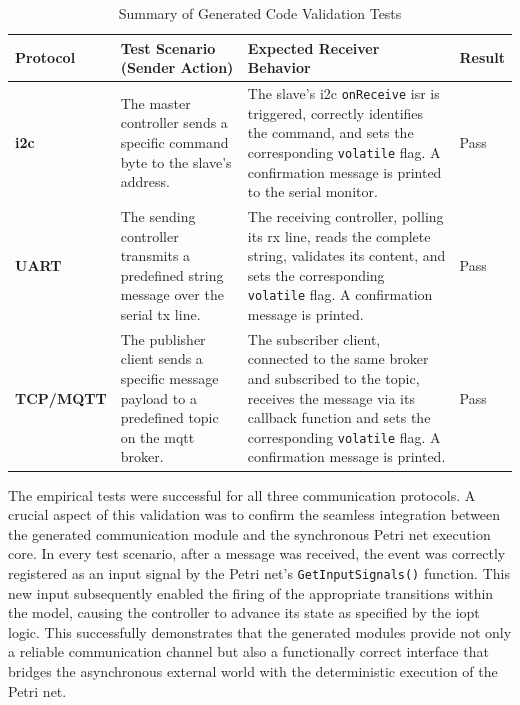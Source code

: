 \begin{table}[h!]
\centering
\caption{Summary of Generated Code Validation Tests}
\label{tab:code_validation_results}
\begin{tabular}{|l|p{4cm}|p{4cm}|p{2cm}|}
\hline
\textbf{Protocol} & \textbf{Test Scenario (Sender Action)} & \textbf{Expected Receiver Behavior} & \textbf{Result} \\ \hline
\textbf{\gls{i2c}} & The master controller sends a specific command byte to the slave's address. & The slave's \gls{i2c} \texttt{onReceive} \gls{isr} is triggered, correctly identifies the command, and sets the corresponding \texttt{volatile} flag. A confirmation message is printed to the serial monitor. & Pass \\ \hline
\textbf{UART} & The sending controller transmits a predefined string message over the serial \gls{tx} line. & The receiving controller, polling its \gls{rx} line, reads the complete string, validates its content, and sets the corresponding \texttt{volatile} flag. A confirmation message is printed. & Pass \\ \hline
\textbf{TCP/MQTT} & The publisher client sends a specific message payload to a predefined topic on the \gls{mqtt} broker. & The subscriber client, connected to the same broker and subscribed to the topic, receives the message via its callback function and sets the corresponding \texttt{volatile} flag. A confirmation message is printed. & Pass \\ \hline
\end{tabular}
\end{table}

 The empirical tests were successful for all three communication protocols. A crucial aspect of this validation was to confirm the seamless integration between the generated communication module and the synchronous Petri net execution core. In every test scenario, after a message was received, the event was correctly registered as an input signal by the Petri net's \texttt{GetInputSignals()} function. This new input subsequently enabled the firing of the appropriate transitions within the model, causing the controller to advance its state as specified by the \gls{iopt} logic. This successfully demonstrates that the generated modules provide not only a reliable communication channel but also a functionally correct interface that bridges the asynchronous external world with the deterministic execution of the Petri net.


